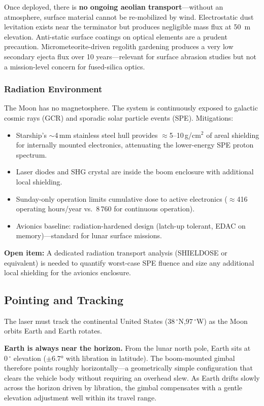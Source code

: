 \documentclass[10pt,letterpaper]{article}
\begin{document}
Once deployed, there is \textbf{no ongoing aeolian transport}---without an
atmosphere, surface material cannot be re-mobilized by wind. Electrostatic
dust levitation exists near the terminator but produces negligible mass flux
at \SI{50}{\meter} elevation. Anti-static surface coatings on optical
elements are a prudent precaution. Micrometeorite-driven regolith gardening
produces a very low secondary ejecta flux over 10 years---relevant for
surface abrasion studies but not a mission-level concern for fused-silica
optics.

\subsubsection*{Radiation Environment}

The Moon has no magnetosphere. The system is continuously exposed to galactic
cosmic rays (GCR) and sporadic solar particle events (SPE). Mitigations:

\begin{itemize}[leftmargin=1.5em]
  \item Starship's $\sim$4\,mm stainless steel hull provides $\approx$5--10\,g/cm$^2$
        of areal shielding for internally mounted electronics, attenuating
        the lower-energy SPE proton spectrum.
  \item Laser diodes and SHG crystal are inside the boom enclosure with
        additional local shielding.
  \item Sunday-only operation limits cumulative dose to active electronics
        ($\approx$416 operating hours/year vs.\ 8\,760 for continuous
        operation).
  \item Avionics baseline: radiation-hardened design (latch-up tolerant,
        EDAC on memory)---standard for lunar surface missions.
\end{itemize}

\noindent \textbf{Open item:} A dedicated radiation transport analysis
(SHIELDOSE or equivalent) is needed to quantify worst-case SPE fluence
and size any additional local shielding for the avionics enclosure.

\subsection{Pointing and Tracking}

The laser must track the continental United States
($38\,^\circ$N,\;$97\,^\circ$W) as the Moon orbits Earth and Earth rotates.

\textbf{Earth is always near the horizon.} From the lunar north pole, Earth sits
at $0\,^\circ$ elevation ($\pm\ang{6.7}$ with libration in latitude). The
boom-mounted gimbal therefore points roughly horizontally---a geometrically
simple configuration that clears the vehicle body without requiring an overhead
slew. As Earth drifts slowly across the horizon driven by libration, the gimbal
compensates with a gentle elevation adjustment well within its travel range.
\end{document}

